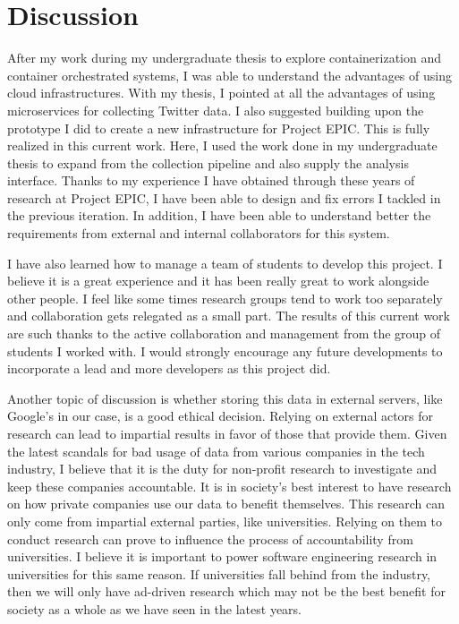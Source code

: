 \chapter{Discussion}

After my work during my undergraduate thesis to explore containerization and container orchestrated systems, I was able to understand the advantages of using cloud infrastructures. With my thesis, I pointed at all the advantages of using microservices for collecting Twitter data. I also suggested building upon the prototype I did to create a new infrastructure for Project EPIC. This is fully realized in this current work. Here, I used the work done in my undergraduate thesis to expand from the collection pipeline and also supply the analysis interface. Thanks to my experience I have obtained through these years of research at Project EPIC, I have been able to design and fix errors I tackled in the previous iteration. In addition, I have been able to understand better the requirements from external and internal collaborators for this system.

I have also learned how to manage a team of students to develop this project. I believe it is a great experience and it has been really great to work alongside other people. I feel like some times research groups tend to work too separately and collaboration gets relegated as a small part. The results of this current work are such thanks to the active collaboration and management from the group of students I worked with. I would strongly encourage any future developments to incorporate a lead and more developers as this project did. 

Another topic of discussion is whether storing this data in external servers, like Google’s in our case, is a good ethical decision. Relying on external actors for research can lead to impartial results in favor of those that provide them. Given the latest scandals for bad usage of data from various companies in the tech industry, I believe that it is the duty for non-profit research to investigate and keep these companies accountable. It is in society’s best interest to have research on how private companies use our data to benefit themselves. This research can only come from impartial external parties, like universities. Relying on them to conduct research can prove to influence the process of accountability from universities. I believe it is important to power software engineering research in universities for this same reason. If universities fall behind from the industry, then we will only have ad-driven research which may not be the best benefit for society as a whole as we have seen in the latest years.

